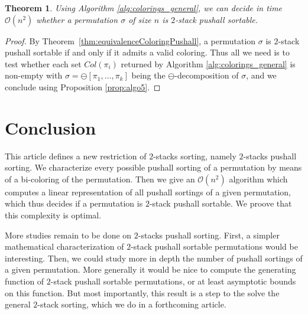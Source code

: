 \documentclass[11pt]{article}
\newtheorem{thm}{Theorem}[section]
\newcommand{\pushall}{$2$-stack pushall sortable\xspace}
\begin{document}
\begin{thm}
Using Algorithm \ref{alg:colorings_general},  we can decide in time ${\mathcal O}(n^{2})$ whether a permutation $\sigma$ of size $n$ is \pushall.
\end{thm}

\begin{proof}
By Theorem~\ref{thm:equivalenceColoringPushall}, a permutation $\sigma$ is \pushall if and only if it admits a valid coloring. 
Thus all we need is to test whether each set $Col(\pi_{i})$ returned by Algorithm \ref{alg:colorings_general} is non-empty 
with $\sigma  = \ominus[\pi_{1},\ldots,\pi_{k}]$ being the $\ominus$-decomposition of $\sigma$, and we conclude	 using Proposition \ref{prop:algo5}.
\end{proof}

\section{Conclusion}\label{sec:conclusion}

This article defines a new restriction of $2$-stacks sorting, namely $2$-stacks pushall sorting.
We characterize every possible pushall sorting of a permutation by means of a bi-coloring of the permutation.
Then we give an $\mathcal O(n^2)$ algorithm which computes a linear representation of all pushall sortings of a given permutation,
which thus decides if a permutation is \pushall.
We proove that this complexity is optimal.

More studies remain to be done on $2$-stacks pushall sorting.
First, a simpler mathematical characterization of \pushall permutations would be interesting.
Then, we could study more in depth the number of pushall sortings of a given permutation.
More generally it would be nice to compute the generating function of \pushall permutations,
or at least asymptotic bounds on this function.
But most importantly, this result is a step to the solve the general $2$-stack sorting,
which we do in a forthcoming article.



\end{document}
